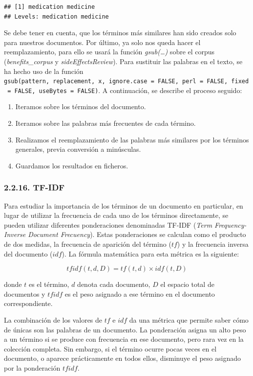 \documentclass[spanish,]{article}
\providecommand{\tightlist}{%
  \setlength{\itemsep}{0pt}\setlength{\parskip}{0pt}}
\begin{document}
\begin{verbatim}
## [1] medication medicine  
## Levels: medication medicine
\end{verbatim}

Se debe tener en cuenta, que los términos más similares han sido creados
solo para nuestros documentos. Por último, ya solo nos queda hacer el
reemplazamiento, para ello se usará la función \emph{gsub(\ldots{})}
sobre el corpus (\emph{benefits\_corpus} y \emph{sideEffectsReview}).
Para sustituir las palabras en el texto, se ha hecho uso de la función
\texttt{gsub(pattern,\ replacement,\ x,\ ignore.case\ =\ FALSE,\ perl\ =\ FALSE,\ fixed\ =\ FALSE,\ useBytes\ =\ FALSE)}.
A continuación, se describe el proceso seguido:

\begin{enumerate}
\def\labelenumi{\arabic{enumi}.}
\tightlist
\item
  Iteramos sobre los términos del documento.
\item
  Iteramos sobre las palabras más frecuentes de cada término.
\item
  Realizamos el reemplazamiento de las palabras más similares por los
  términos generales, previa conversión a minúsculas.
\item
  Guardamos los resultados en ficheros.
\end{enumerate}

\subsubsection{2.2.16. TF-IDF}\label{tf-idf}

Para estudiar la importancia de los términos de un documento en
particular, en lugar de utilizar la frecuencia de cada uno de los
términos directamente, se pueden utilizar diferentes ponderaciones
denominadas TF-IDF (\emph{Term Frequency-Inverse Document Frecuency}).
Estas ponderaciones se calculan como el producto de dos medidas, la
frecuencia de aparición del término (\(tf\)) y la frecuencia inversa del
documento (\(idf\)). La fórmula matemática para esta métrica es la
siguiente:

\[ tfidf(t, d, D) = tf(t, d) × idf(t, D)\]

donde \(t\) es el término, \(d\) denota cada documento, \(D\) el espacio
total de documentos y \(tfidf\) es el peso asignado a ese término en el
documento correspondiente.

La combinación de los valores de \(tf\) e \(idf\) da una métrica que
permite saber cómo de únicas son las palabras de un documento. La
ponderación asigna un alto peso a un término si se produce con
frecuencia en ese documento, pero rara vez en la colección completa. Sin
embargo, si el término ocurre pocas veces en el documento, o aparece
prácticamente en todos ellos, disminuye el peso asignado por la
ponderación \(tfidf\).
\end{document}
